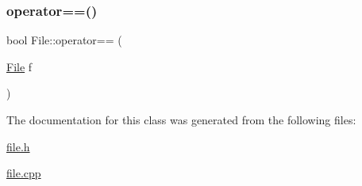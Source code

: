 \mbox{\label{class_file_aadbe64432e7e403f546ff35a3bfa8d97}} 
\subsubsection{\texorpdfstring{operator==()}{operator==()}}
{\footnotesize\ttfamily bool File\+::operator== (\begin{DoxyParamCaption}\item[{\hyperlink{class_file}{File}}]{f }\end{DoxyParamCaption})\hspace{0.3cm}{\ttfamily [inline]}}



The documentation for this class was generated from the following files\+:\begin{DoxyCompactItemize}
\item 
\hyperlink{file_8h}{file.\+h}\item 
\hyperlink{file_8cpp}{file.\+cpp}\end{DoxyCompactItemize}
